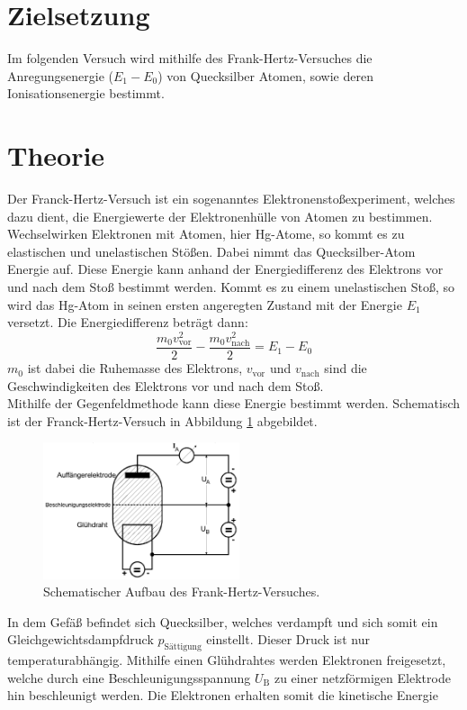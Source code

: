 \section{Zielsetzung}

Im folgenden Versuch wird mithilfe des Frank-Hertz-Versuches die Anregungsenergie ($E_1 - E_0$) von Quecksilber Atomen, sowie deren Ionisationsenergie bestimmt.

\section{Theorie}
\label{sec:Theorie}

Der Franck-Hertz-Versuch ist ein sogenanntes Elektronensto{\ss}experiment, welches dazu dient, die Energiewerte der Elektronenhülle von Atomen zu bestimmen. Wechselwirken Elektronen mit Atomen, hier Hg-Atome, so kommt es zu elastischen und unelastischen Stö{\ss}en. Dabei nimmt das Quecksilber-Atom Energie auf. Diese Energie kann anhand der Energiedifferenz des Elektrons vor und nach dem Sto{\ss} bestimmt werden. Kommt es zu einem unelastischen Sto{\ss}, so wird das Hg-Atom in seinen ersten angeregten Zustand mit der Energie $E_1$ versetzt. Die Energiedifferenz beträgt dann:
\begin{equation}
	\frac{m_0 v^2_\text{vor}}{2} - \frac{m_0 v^2_\text{nach}}{2} = E_1 - E_0
\end{equation}
$m_0$ ist dabei die Ruhemasse des Elektrons, $v_\text{vor}$ und $v_\text{nach}$ sind die Geschwindigkeiten des Elektrons vor und nach dem Sto{\ss}. \\
Mithilfe der Gegenfeldmethode kann diese Energie bestimmt werden. Schematisch ist der Franck-Hertz-Versuch in Abbildung \ref{fig:Schema} abgebildet.
\begin{figure}[H]
    \centering
    \includegraphics[height=4cm]{Theorie/Schema.pdf}
    \caption{Schematischer Aufbau des Frank-Hertz-Versuches.}
    \label{fig:Schema}
\end{figure}
In dem Gefäß befindet sich Quecksilber, welches verdampft und sich somit ein Gleichgewichtsdampfdruck $p_\text{Sättigung}$ einstellt. Dieser Druck ist nur temperaturabhängig. Mithilfe einen Glühdrahtes werden Elektronen freigesetzt, welche durch eine Beschleunigungsspannung $U_\text{B}$ zu einer netzförmigen Elektrode hin beschleunigt werden. Die Elektronen erhalten somit die kinetische Energie
